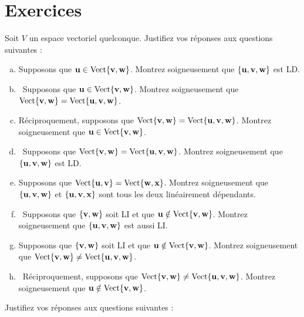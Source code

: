 \section*{Exercices}


 \begin{prob} \label{prob08.1} Soit $V$ un espace vectoriel quelconque. Justifiez vos réponses aux questions suivantes : 
\begin{enumerate}[a)] 

\item Supposons que $\uu \in \sp{\vv,\ww}$. Montrez soigneusement que $\set{\uu,\vv,\ww}$ est LD.
\medskip
 
\item\sov~Supposons que $\uu \in \sp{\vv,\ww}$. Montrez soigneusement que $\sp{\vv,\ww}=\sp{\uu,\vv,\ww}$.
\medskip
 

\item Réciproquement, supposons que $\sp{\vv,\ww}=\sp{\uu,\vv,\ww}$. Montrez soigneusement que $\uu \in \sp{\vv,\ww}$. 
\medskip
 

\item\sov~Supposons que $\sp{\vv,\ww}=\sp{\uu,\vv,\ww}$. Montrez soigneusement que $\set{\uu,\vv,\ww}$ est LD. 
\medskip
 

\item Supposons que $\sp{\uu,\vv}=\sp{\ww,\xx}$. Montrez soigneusement que $\set{\uu,\vv,\ww}$ et $\set{\uu,\vv,\xx}$ sont tous les deux linéairement dépendants. 
\medskip
 
 
\item\sov~Supposons que $\set{\vv,\ww}$ soit LI et que $\uu \notin \sp{\vv,\ww}$. Montrez soigneusement que $\set{\uu,\vv,\ww}$ est aussi LI.
\medskip
  
\item Supposons que $\set{\vv,\ww}$ soit LI et que $\uu \notin \sp{\vv,\ww}$. Montrez soigneusement que $\sp{\vv,\ww}\not=\sp{\uu,\vv,\ww}$.
\medskip
 

\item\sov~Réciproquement, supposons que $\sp{\vv,\ww}\not=\sp{\uu,\vv,\ww}$. Montrez soigneusement que $\uu \notin \sp{\vv,\ww}$. 
\medskip
  
\end{enumerate}

\end{prob} \begin{prob} \label{prob08.2} Justifiez vos réponses aux questions suivantes :\medskip
\begin{enumerate}[a)] 



\end{enumerate}
\end{prob}
